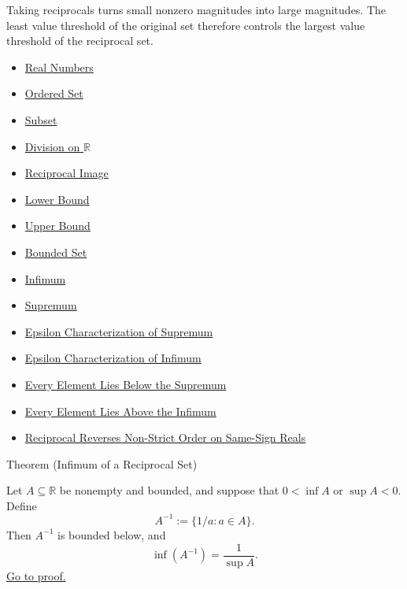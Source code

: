 \begin{remark*}[Interpretation]
Taking reciprocals turns small nonzero magnitudes into large magnitudes.  The
least value threshold of the original set therefore controls the largest value
threshold of the reciprocal set.
\end{remark*}

\begin{dependencies}
\begin{itemize}
  \item \hyperref[def:reals]{Real Numbers}
  \item \hyperref[def:ordered-set]{Ordered Set}
  \item \hyperref[def:subset]{Subset}
  \item \hyperref[def:division-on-r]{Division on $\mathbb{R}$}
  \item \hyperref[def:reciprocal-image]{Reciprocal Image}
  \item \hyperref[def:real-lower-bound]{Lower Bound}
  \item \hyperref[def:real-upper-bound]{Upper Bound}
  \item \hyperref[def:bounded]{Bounded Set}
  \item \hyperref[def:infimum]{Infimum}
  \item \hyperref[def:supremum]{Supremum}
  \item \hyperref[def:epsilon-characterization-of-supremum]{Epsilon Characterization of Supremum}
  \item \hyperref[def:epsilon-characterization-of-infimum]{Epsilon Characterization of Infimum}
  \item \hyperref[prop:every-element-lies-below-the-supremum]{Every Element Lies Below the Supremum}
  \item \hyperref[prop:every-element-lies-above-the-infimum]{Every Element Lies Above the Infimum}
  \item \hyperref[thm:reciprocal-reverses-nonstrict-order-on-same-sign-r]{Reciprocal Reverses Non-Strict Order on Same-Sign Reals}
\end{itemize}
\end{dependencies}



\begin{theorembox}{Theorem (Infimum of a Reciprocal Set)}
\begin{theorem}
\label{thm:infimum-reciprocal-set}
Let $A\subseteq\mathbb{R}$ be nonempty and bounded, and suppose that
$0<\inf A$ or $\sup A<0$.  Define
\[
  A^{-1}:=\{1/a:a\in A\}.
\]
Then $A^{-1}$ is bounded below, and
\[
  \inf(A^{-1})=\frac{1}{\sup A}.
\]
\hyperref[prf:infimum-reciprocal-set]{Go to proof.}
\end{theorem}
\end{theorembox}

